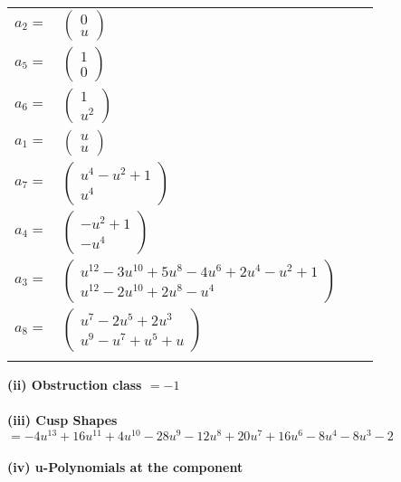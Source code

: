 \documentclass[1p]{elsarticle_modified}
\theoremstyle{definition}
\begin{document}
\begin{tabular}{m{7pt} m{180pt} m{7pt} m{180pt} }
\flushright $a_{2}=$&$\begin{pmatrix}0\\u\end{pmatrix}$ \\
\flushright $a_{5}=$&$\begin{pmatrix}1\\0\end{pmatrix}$ \\
\flushright $a_{6}=$&$\begin{pmatrix}1\\u^2\end{pmatrix}$ \\
\flushright $a_{1}=$&$\begin{pmatrix}u\\u\end{pmatrix}$ \\
\flushright $a_{7}=$&$\begin{pmatrix}u^4- u^2+1\\u^4\end{pmatrix}$ \\
\flushright $a_{4}=$&$\begin{pmatrix}- u^2+1\\- u^4\end{pmatrix}$ \\
\flushright $a_{3}=$&$\begin{pmatrix}u^{12}-3 u^{10}+5 u^8-4 u^6+2 u^4- u^2+1\\u^{12}-2 u^{10}+2 u^8- u^4\end{pmatrix}$ \\
\flushright $a_{8}=$&$\begin{pmatrix}u^7-2 u^5+2 u^3\\u^9- u^7+u^5+u\end{pmatrix}$\\&\end{tabular}
\flushleft \textbf{(ii) Obstruction class $= -1$}\\~\\
\flushleft \textbf{(iii) Cusp Shapes $= -4 u^{13}+16 u^{11}+4 u^{10}-28 u^9-12 u^8+20 u^7+16 u^6-8 u^4-8 u^3-2$}\\~\\
\newpage\renewcommand{\arraystretch}{1}
\flushleft \textbf{(iv) u-Polynomials at the component}\newline \\
\end{document}
